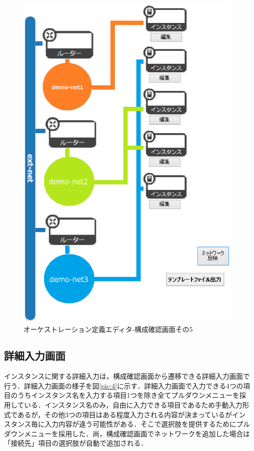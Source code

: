 \documentclass[mingoth]{kut-paper}		%
\begin{document}
		\begin{figure}[H]
			\begin{center}
				\includegraphics[scale=0.55]{Document/構成確認画面ex2.eps}
				\caption{オーケストレーション定義エディタ-構成確認画面その5}
				\label{pic:6}
			\end{center}
		\end{figure}
		
		
		\subsection{詳細入力画面}
		インスタンスに関する詳細入力は，構成確認画面から遷移できる詳細入力画面で行う．詳細入力画面の様子を図\ref{pic:4}に示す．詳細入力画面で入力できる4つの項目のうちインスタンス名を入力する項目1つを除き全てプルダウンメニューを採用している．インスタンス名のみ，自由に入力できる項目であるため手動入力形式であるが，その他3つの項目はある程度入力される内容が決まっているがインスタンス毎に入力内容が違う可能性がある．そこで選択肢を提供するためにプルダウンメニューを採用した．尚，構成確認画面でネットワークを追加した場合は「接続先」項目の選択肢が自動で追加される．
		
\end{document}
